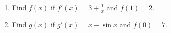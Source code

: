 \begin{enumerate}
\item Find $f(x)$ if $f'(x) = 3 + \frac{1}{x}$ and $f(1) = 2$.

\item Find $g(x)$ if $g'(x) = x - \sin x$ and $f(0) = 7$.

\end{enumerate}
